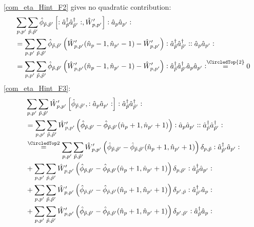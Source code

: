 \begin{appendix}
\begin{itemize}
\begin{align}
\end{align}
\ref{com_eta_Hint_F2} gives no quadratic contribution:
\begin{align}
&\Sum_{p, p^\prime}\Sum_{\tilde p,\tilde p^\prime}\hat\phi_{\tilde p,\tilde p^\prime} \left[\NO\CR_{\tilde p}\CR_{\tilde p^\prime}\NO,\hat W_{p,p^\prime}^\prime\right]\NO\AN_p\AN_{p^\prime}\NO\nonumber\\
&=\Sum_{p, p^\prime}\Sum_{\tilde p,\tilde p^\prime}\hat\phi_{\tilde p,\tilde p^\prime} \left(\hat W_{p,p^\prime}^\prime(\hat n_p-1,\hat n_{p^\prime}-1)-\hat W_{p,p^\prime}^\prime\right)\NO\CR_{\tilde p}\CR_{\tilde p^\prime}\NO\NO\AN_p\AN_{p^\prime}\NO\nonumber\\
&=\Sum_{p, p^\prime}\Sum_{\tilde p,\tilde p^\prime}\hat\phi_{\tilde p,\tilde p^\prime} \left(\hat W_{p,p^\prime}^\prime(\hat n_p-1,\hat n_{p^\prime}-1)-\hat W_{p,p^\prime}^\prime\right)\NO\CR_{\tilde p}\CR_{\tilde p^\prime}\AN_p\AN_{p^\prime}\NO\overset{\CircledTop{2}}=0
\end{align}
\ref{com_eta_Hint_F3}:
\begin{align}
&\Sum_{p, p^\prime}\Sum_{\tilde p,\tilde p^\prime}\hat W_{p,p^\prime}^\prime \left[\hat\phi_{\tilde p,\tilde p^\prime},\NO\AN_p\AN_{p^\prime}\NO\right]\NO\CR_{\tilde p}\CR_{\tilde p^\prime}\NO\nonumber\\
&=\Sum_{p, p^\prime}\Sum_{\tilde p,\tilde p^\prime}\hat W_{p,p^\prime}^\prime \left(\hat\phi_{\tilde p,\tilde p^\prime}-\hat\phi_{\tilde p,\tilde p^\prime}(\hat n_p+1,\hat n_{p^\prime}+1)\right)\NO\AN_p\AN_{p^\prime}\NO\NO\CR_{\tilde p}\CR_{\tilde p^\prime}\NO\\
&\eqsec \Sum_{p, p^\prime}\Sum_{\tilde p,\tilde p^\prime}\hat W_{p,p^\prime}^\prime \left(\hat\phi_{\tilde p,\tilde p^\prime}-\hat\phi_{\tilde p,\tilde p^\prime}(\hat n_p+1,\hat n_{p^\prime}+1)\right)\delta_{p,\tilde p}\NO\CR_{\tilde p^\prime}\AN_{p^\prime}\NO \\
&+\Sum_{p, p^\prime}\Sum_{\tilde p,\tilde p^\prime}\hat W_{p,p^\prime}^\prime \left(\hat\phi_{\tilde p,\tilde p^\prime}-\hat\phi_{\tilde p,\tilde p^\prime}(\hat n_p+1,\hat n_{p^\prime}+1)\right)\delta_{p,\tilde p^\prime}\NO\CR_{\tilde p}\AN_{p^\prime}\NO \nonumber\\
&+\Sum_{p, p^\prime}\Sum_{\tilde p,\tilde p^\prime}\hat W_{p,p^\prime}^\prime \left(\hat\phi_{\tilde p,\tilde p^\prime}-\hat\phi_{\tilde p,\tilde p^\prime}(\hat n_p+1,\hat n_{p^\prime}+1)\right)\delta_{p^\prime,\tilde p}\NO\CR_{\tilde p^\prime}\AN_{p}\NO \nonumber\\
&+\Sum_{p, p^\prime}\Sum_{\tilde p,\tilde p^\prime}\hat W_{p,p^\prime}^\prime \left(\hat\phi_{\tilde p,\tilde p^\prime}-\hat\phi_{\tilde p,\tilde p^\prime}(\hat n_p+1,\hat n_{p^\prime}+1)\right)\delta_{p^\prime,\tilde p^\prime}\NO\CR_{\tilde p}\AN_{p}\NO \nonumber\\

\end{align}
\end{itemize}
\end{appendix}
